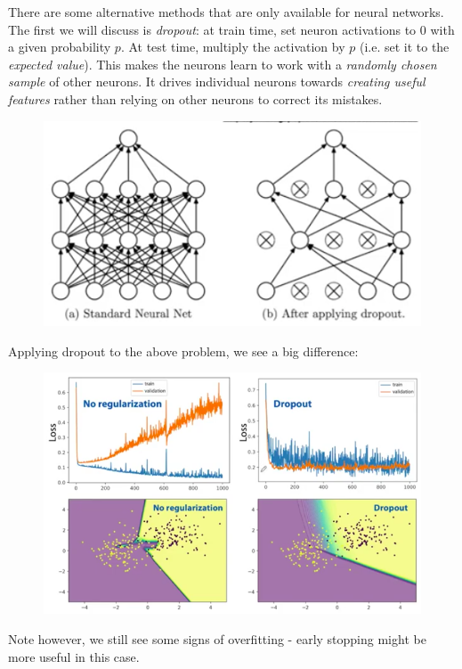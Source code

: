 There are some alternative methods that are only available for neural networks. The first we will discuss is \textit{dropout}: at train time, set neuron activations to $0$ with a given probability $p$. At test time, multiply the activation by $p$ (i.e. set it to the \textit{expected value}). This makes the neurons learn to work with a \textit{randomly chosen sample} of other neurons. It drives individual neurons towards \textit{creating useful features} rather than relying on other neurons to correct its mistakes. 
\begin{figure}[H]
\centering
\includegraphics[scale=0.4]{dropout.png}
\end{figure}
Applying dropout to the above problem, we see a big difference:
\begin{figure}[H]
\centering
\includegraphics[scale=0.4]{dropoutoverfitting.png}
\end{figure}
Note however, we still see some signs of overfitting - early stopping might be more useful in this case.




\newpage

